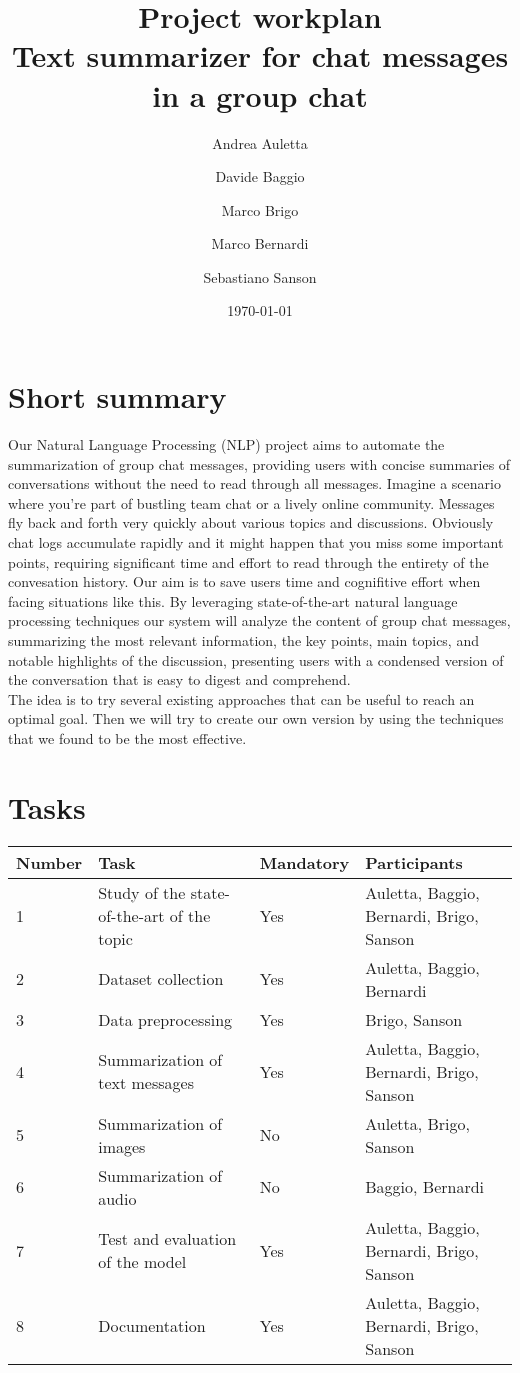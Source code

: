\documentclass[12pt]{article}
\title{\textbf{Project workplan} \\ 
    \large Text summarizer for chat messages in a group chat}
\author{
    Andrea Auletta
    \and
    Davide Baggio
    \and
    Marco Brigo
    \and
    Marco Bernardi
    \and
    Sebastiano Sanson
}
\date{\today}
\begin{document}
\maketitle
\newpage
\tableofcontents
\newpage


\section{Short summary}
Our Natural Language Processing (NLP) project aims to automate the summarization of group 
chat messages, providing users with concise summaries of conversations without the need to 
read through all messages. Imagine a scenario where you're part of bustling team chat or a 
lively online community. Messages fly back and forth very quickly about various topics and 
discussions. Obviously chat logs accumulate rapidly and it might happen that you miss some 
important points, requiring significant time and effort to read through the entirety of the
convesation history. Our aim is to save users time and cognifitive effort when facing 
situations like this. By leveraging state-of-the-art natural language processing techniques 
our system will analyze the content of group chat messages, summarizing the most relevant 
information, the key points, main topics, and notable highlights of the discussion, 
presenting users with a condensed version of the conversation that is easy to digest and 
comprehend. \\ 
The idea is to try several existing approaches that can be useful to reach an optimal goal. 
Then we will try to create our own version by using the techniques that we found to be the 
most effective.
\section{Tasks}
\begin{center}
    \begin{tabular}{ |p{1.5cm}|p{3cm}|p{2cm}|p{3cm}|} 
        \hline
        Number & Task & Mandatory & Participants\\
        \hline
        1 & Study of the state-of-the-art of the topic & Yes & Auletta, Baggio, Bernardi, Brigo, Sanson\\ 
        \hline
        2 &  Dataset collection & Yes & Auletta, Baggio, Bernardi \\
        \hline
        3 & Data preprocessing & Yes & Brigo, Sanson \\
        \hline
        4 & Summarization of text messages & Yes & Auletta, Baggio, Bernardi, Brigo, Sanson \\
        \hline
        5 & Summarization of images & No & Auletta, Brigo, Sanson \\
        \hline
        6 & Summarization of audio & No & Baggio, Bernardi \\
        \hline
        7 & Test and evaluation of the model & Yes & Auletta, Baggio, Bernardi, Brigo, Sanson \\
        \hline
        8 & Documentation & Yes & Auletta, Baggio, Bernardi, Brigo, Sanson \\
        \hline     
    \end{tabular}
\end{center}
\newpage
\end{document}
